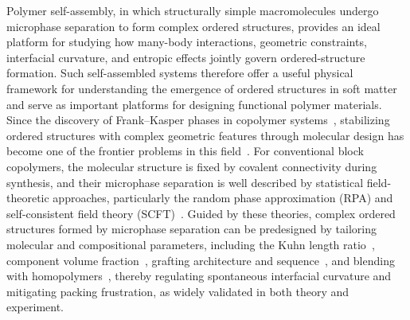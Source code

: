 Polymer self-assembly, in which structurally simple macromolecules undergo microphase separation to form complex ordered structures, provides an ideal platform for studying how many-body interactions, geometric constraints, interfacial curvature, and entropic effects jointly govern ordered-structure formation.
Such self-assembled systems therefore offer a useful physical framework for understanding the emergence of ordered structures in soft matter and serve as important platforms for designing functional polymer materials.
Since the discovery of Frank--Kasper phases in copolymer systems~\cite{Lee2010Discovery}, stabilizing ordered structures with complex geometric features through molecular design has become one of the frontier problems in this field~\cite{Chang2024FrankKasperlike, Lai2025Effects, Su2019Identification, Zhao2019Laves}.
For conventional block copolymers, the molecular structure is fixed by covalent connectivity during synthesis, and their microphase separation is well described by statistical field-theoretic approaches, particularly the random phase approximation (RPA) and self-consistent field theory (SCFT)~\cite{Borsali1996Scattering, Leibler1980Theory, Read1998Mean, XinghuaZhang2013Effects, Huang1998SelfConsistent, Bates1999Block, Whitmore1990Selfconsistent, Arora2016Broadly, Li2024Effect, Liu2024Nonadditive, Liu2025Orientation}.
Guided by these theories, complex ordered structures formed by microphase separation can be predesigned by tailoring molecular and compositional parameters, including the Kuhn length ratio~\cite{AbhiramReddy2018Stable, Gillard2016Dodecagonal}, 
component volume fraction~\cite{Qin2024Microphase, Chu2024Simulation, Xie2023Phase, Wang2023Enantiomers}, 
grafting architecture and sequence~\cite{Chu2024Simulation, Li2021Effect, Xie2020Synergistic, Jiang2018Effects, Li2017Nonclassical}, 
and blending with homopolymers~\cite{Xie2024Phase, Xie2021Formation, Kim2018Origins, ZhengpingZhou2018Preferred, Sides2004Continuous}, 
thereby regulating spontaneous interfacial curvature and mitigating packing frustration, as widely validated in both theory and experiment\cite{Xu2024Architectural}.


